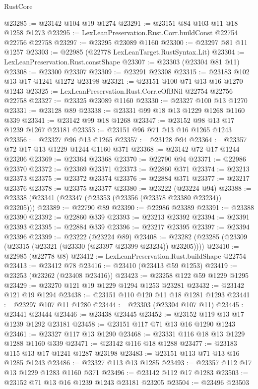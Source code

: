 \begin{lexlean}{RustCore}
\begin{coremodule}
@23285 := @23142 @104 @19 @1274
@23291 := @23151 @84 @103 @11 @18 @1258 @1273
@23295 := LexLeanPreservation.Rust.Corr.buildConst @22754 @22756 @22758
@23297 := @23295 @23089 @1160
@23300 := @23297 @81 @11 @1257
@23303 := @22985 (@22778 LexLeanTarget.RustSyntax.Lit)
@23304 := LexLeanPreservation.Rust.constShape
@23307 := @23303 (@23304 @81 @11)
@23308 := @23300 @23307
@23309 := @23291 @23308
@23315 := @23183 @102 @13 @17 @1241 @1272 @23198
@23321 := @23151 @100 @71 @13 @16 @1270 @1243
@23325 := LexLeanPreservation.Rust.Corr.eOfBNil @22754 @22756 @22758
@23327 := @23325 @23089 @1160
@23330 := @23327 @100 @13 @1270
@23331 := @23128 @89
@23338 := @23331 @99 @18 @13 @1229 @1268 @1160 @339
@23341 := @23142 @99 @18 @1268
@23347 := @23152 @98 @13 @17 @1239 @1267 @23181
@23353 := @23151 @96 @71 @13 @16 @1265 @1243
@23356 := @23327 @96 @13 @1265
@23357 := @23128 @94
@23364 := @23357 @72 @17 @13 @1229 @1244 @1160 @371
@23368 := @23142 @72 @17 @1244 @23206
@23369 := @23364 @23368
@23370 := @22790 @94
@23371 := @22986 @23370
@23372 := @23369 @23371
@23373 := @22860 @371
@23374 := @23213 @23373
@23375 := @23372 @23374
@23376 := @22884 @371
@23377 := @23217 @23376
@23378 := @23375 @23377
@23380 := @23222 (@23224 @94)
@23388 := @23338 (@23341 (@23347 (@23353 (@23356 (@23378 @23380 @23234)) @23205)))
@23389 := @22790 @89
@23390 := @22986 @23389
@23391 := @23388 @23390
@23392 := @22860 @339
@23393 := @23213 @23392
@23394 := @23391 @23393
@23395 := @22884 @339
@23396 := @23217 @23395
@23397 := @23394 @23396
@23399 := @23222 (@23224 @89)
@23408 := @23282 (@23285 (@23309 (@23315 (@23321 (@23330 (@23397 @23399 @23234)) @23205))))
@23410 := @22985 (@22778 @8)
@23412 := LexLeanPreservation.Rust.buildShape @22754
@23413 := @23412 @78
@23416 := @23410 (@23413 @59 @1253)
@23419 := @23253 (@23262 (@23408 @23416))
@23423 := @23258 @122 @59 @1229 @1295
@23429 := @23270 @121 @19 @1229 @1294 @1253 @23281
@23432 := @23142 @121 @19 @1294
@23438 := @23151 @110 @120 @11 @18 @1281 @1293
@23441 := @23297 @107 @11 @1280
@23444 := @23303 (@23304 @107 @11)
@23445 := @23441 @23444
@23446 := @23438 @23445
@23452 := @23152 @119 @13 @17 @1239 @1292 @23181
@23458 := @23151 @117 @71 @13 @16 @1290 @1243
@23461 := @23327 @117 @13 @1290
@23468 := @23331 @116 @18 @13 @1229 @1288 @1160 @339
@23471 := @23142 @116 @18 @1288
@23477 := @23183 @115 @13 @17 @1241 @1287 @23198
@23483 := @23151 @113 @71 @13 @16 @1285 @1243
@23486 := @23327 @113 @13 @1285
@23493 := @23357 @112 @17 @13 @1229 @1283 @1160 @371
@23496 := @23142 @112 @17 @1283
@23503 := @23152 @71 @13 @16 @1239 @1243 @23181 @23205
@23504 := @23496 @23503

\end{coremodule}
\end{lexlean}
